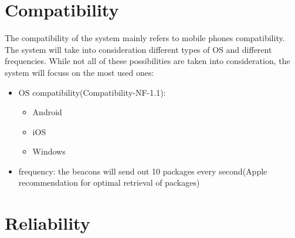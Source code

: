 \section{Compatibility}
The compatibility of the system mainly refers to mobile phones compatibility. The system will take into consideration different types of OS and different frequencies. While not all of these possibilities are taken into consideration, the system will focuss on the most used ones:

\begin{itemize}
	\item OS compatibility(Compatibility-NF-1.1): \\
	\begin{itemize}
		\item Android
		\item iOS
		\item Windows
	\end{itemize}
	\item frequency: the beacons will send out 10 packages every second(Apple recommendation for optimal retrieval of packages\cite{web:beacons})
\end{itemize}

\section{Reliability}

